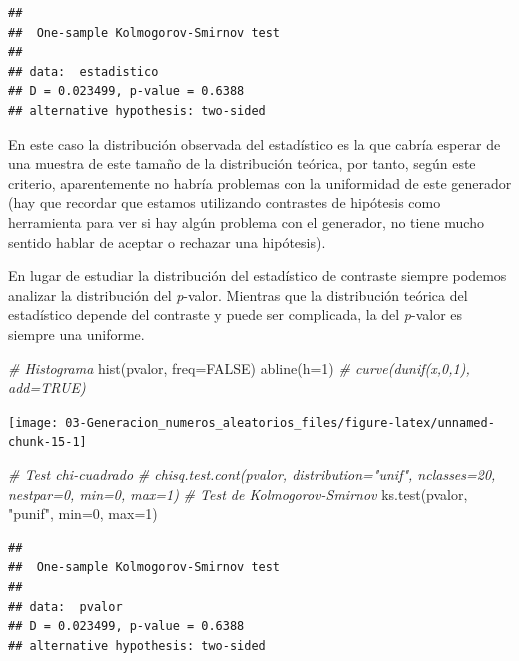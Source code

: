 \documentclass[
]{book}
\newenvironment{Shaded}{\begin{snugshade}}{\end{snugshade}}
\newcommand{\AttributeTok}[1]{\textcolor[rgb]{0.77,0.63,0.00}{#1}}
\newcommand{\CommentTok}[1]{\textcolor[rgb]{0.56,0.35,0.01}{\textit{#1}}}
\newcommand{\ConstantTok}[1]{\textcolor[rgb]{0.00,0.00,0.00}{#1}}
\newcommand{\DecValTok}[1]{\textcolor[rgb]{0.00,0.00,0.81}{#1}}
\newcommand{\FunctionTok}[1]{\textcolor[rgb]{0.00,0.00,0.00}{#1}}
\newcommand{\NormalTok}[1]{#1}
\newcommand{\StringTok}[1]{\textcolor[rgb]{0.31,0.60,0.02}{#1}}
\theoremstyle{break}
\theoremstyle{definition}
\theoremstyle{definition}
\theoremstyle{definition}
\theoremstyle{definition}
\theoremstyle{remark}
\begin{document}
\begin{verbatim}
## 
##  One-sample Kolmogorov-Smirnov test
## 
## data:  estadistico
## D = 0.023499, p-value = 0.6388
## alternative hypothesis: two-sided
\end{verbatim}

En este caso la distribución observada del estadístico es la que cabría esperar de una muestra de este tamaño de la distribución teórica, por tanto, según este criterio, aparentemente no habría problemas con la uniformidad de este generador (hay que recordar que estamos utilizando contrastes de hipótesis como herramienta para ver si hay algún problema con el generador, no tiene mucho sentido hablar de aceptar o rechazar una hipótesis).

En lugar de estudiar la distribución del estadístico de contraste siempre podemos analizar la distribución del \emph{p}-valor.
Mientras que la distribución teórica del estadístico depende del contraste y puede ser complicada, la del \emph{p}-valor es siempre una uniforme.

\begin{Shaded}
\begin{Highlighting}[]
\CommentTok{\# Histograma}
\FunctionTok{hist}\NormalTok{(pvalor, }\AttributeTok{freq=}\ConstantTok{FALSE}\NormalTok{)}
\FunctionTok{abline}\NormalTok{(}\AttributeTok{h=}\DecValTok{1}\NormalTok{) }\CommentTok{\# curve(dunif(x,0,1), add=TRUE)}
\end{Highlighting}
\end{Shaded}

\begin{center}\texttt{[image: 03-Generacion\_numeros\_aleatorios\_files/figure-latex/unnamed-chunk-15-1]} \end{center}

\begin{Shaded}
\begin{Highlighting}[]
\CommentTok{\# Test chi{-}cuadrado}
\CommentTok{\# chisq.test.cont(pvalor, distribution="unif", nclasses=20, nestpar=0, min=0, max=1)}
\CommentTok{\# Test de Kolmogorov{-}Smirnov}
\FunctionTok{ks.test}\NormalTok{(pvalor, }\StringTok{"punif"}\NormalTok{,  }\AttributeTok{min=}\DecValTok{0}\NormalTok{, }\AttributeTok{max=}\DecValTok{1}\NormalTok{)}
\end{Highlighting}
\end{Shaded}

\begin{verbatim}
## 
##  One-sample Kolmogorov-Smirnov test
## 
## data:  pvalor
## D = 0.023499, p-value = 0.6388
## alternative hypothesis: two-sided
\end{verbatim}
\end{document}

